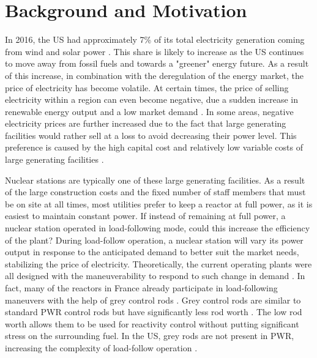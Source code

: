 \documentclass[edeposit,fullpage]{uiucthesis2009}
\begin{document}
\section{Background and Motivation}

In 2016, the \gls{US} had approximately 7\% of its total electricity generation coming from wind and solar power \cite{u.s_energy_information_administration_electricity_2016}. 
This share is likely to increase as the \gls{US} continues to move away from fossil fuels and towards a "greener" energy future.
As a result of this increase, in combination with the deregulation of the energy market, the price of electricity has become volatile. 
At certain times, the price of selling electricity within a region can even become negative, due a sudden increase in renewable energy output and a low market demand \cite{paraschiv_impact_2014}. 
In some areas, negative electricity prices are further increased due to the fact that large generating facilities would rather sell at a loss to avoid decreasing their power level. 
This preference is caused by the high capital cost and relatively low variable costs of large generating facilities \cite{lokhov_load-following_2011}.

Nuclear stations are typically one of these large generating facilities.
As a result of the large construction costs and the fixed number of staff members that must be on site at all times, most utilities prefer to keep a reactor at full power, as it is easiest to maintain constant power. 
If instead of remaining at full power, a nuclear station operated in load-following mode, could this increase the efficiency of the plant?
During load-follow operation, a nuclear station will vary its power output in response to the anticipated demand to better suit the market needs, stabilizing the price of electricity.
Theoretically, the current operating plants were all designed with the maneuverability to respond to such change in demand \cite{lokhov_technical_2011}.
In fact, many of the reactors in France already participate in load-following maneuvers with the help of grey control rods \cite{lokhov_technical_2011}.
Grey control rods are similar to standard \gls{PWR} control rods but have significantly less rod worth \cite{yousefpour_improvement_2000}.
The low rod worth allows them to be used for reactivity control without putting significant stress on the surrounding fuel. 
In the \gls{US}, grey rods are not present in \gls{PWR}, increasing the complexity of load-follow operation \cite{lokhov_technical_2011}.
  
\end{document}
